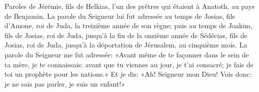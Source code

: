 Paroles de Jérémie, fils de Helkias,
	l’un des prêtres qui étaient à Anatoth, au pays de Benjamin.
La parole du Seigneur lui fut adressée au temps de Josias,
		fils d’Amone, roi de Juda, la treizième année de son règne;
	puis au temps de Joakim, fils de Josias, roi de Juda,
	jusqu’à la fin de la onzième année de Sédécias, fils de Josias, roi de Juda,
	jusqu’à la déportation de Jérusalem, au cinquième mois.
La parole du Seigneur me fut adressée:
	«Avant même de te façonner dans le sein de ta mère, je te connaissais;
	avant que tu viennes au jour, je t’ai consacré;
	je fais de toi un prophète pour les nations.»
Et je dis: «Ah! Seigneur mon Dieu! Vois donc:
	je ne sais pas parler, je suis un enfant!»
